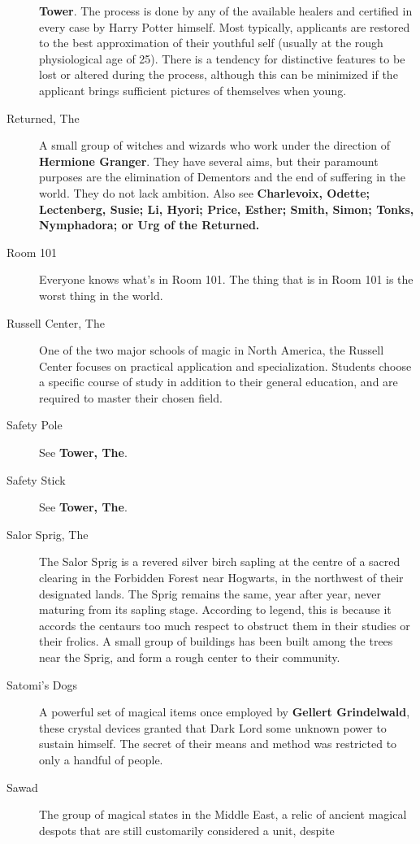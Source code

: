 \begin{description}
\textbf{Tower}. The process is done by any of the available healers and
certified in every case by Harry Potter himself. Most typically,
applicants are restored to the best approximation of their youthful self
(usually at the rough physiological age of 25). There is a tendency for
distinctive features to be lost or altered during the process, although
this can be minimized if the applicant brings sufficient pictures of
themselves when young.
\item[Returned, The]
A small group of witches and wizards who work under the direction of
\textbf{Hermione Granger}. They have several aims, but their paramount
purposes are the elimination of Dementors and the end of suffering in
the world. They do not lack ambition. Also see \textbf{Charlevoix,
Odette; Lectenberg, Susie; Li, Hyori; Price, Esther; Smith, Simon;
Tonks, Nymphadora; or Urg of the Returned.}
\item[Room 101]
Everyone knows what's in Room 101. The thing that is in Room 101 is the
worst thing in the world.
\item[Russell Center, The]
One of the two major schools of magic in North America, the Russell
Center focuses on practical application and specialization. Students
choose a specific course of study in addition to their general
education, and are required to master their chosen field.
\item[Safety Pole]
See \textbf{Tower, The}.
\item[Safety Stick]
See \textbf{Tower, The}.
\item[Salor Sprig, The]
The Salor Sprig is a revered silver birch sapling at the centre of a
sacred clearing in the Forbidden Forest near Hogwarts, in the northwest
of their designated lands. The Sprig remains the same, year after year,
never maturing from its sapling stage. According to legend, this is
because it accords the centaurs too much respect to obstruct them in
their studies or their frolics. A small group of buildings has been
built among the trees near the Sprig, and form a rough center to their
community.
\item[Satomi's Dogs]
A powerful set of magical items once employed by \textbf{Gellert
Grindelwald}, these crystal devices granted that Dark Lord some unknown
power to sustain himself. The secret of their means and method was
restricted to only a handful of people.
\item[Sawad]
The group of magical states in the Middle East, a relic of ancient
magical despots that are still customarily considered a unit, despite

\end{description}
